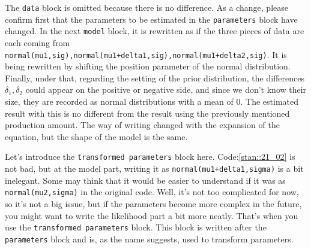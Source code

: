 \documentclass{ltjsbook}
\begin{document}
The \verb|data| block is omitted because there is no difference. As a change, please confirm first that the parameters to be estimated in the \verb|parameters| block have changed.
In the next \verb|model| block, it is rewritten as if the three pieces of data are each coming from \verb|normal(mu1,sig),normal(mu1+delta1,sig),normal(mu1+delta2,sig)|. It is being rewritten by shifting the position parameter of the normal distribution.
Finally, under that, regarding the setting of the prior distribution, the differences $\delta_1, \delta_2$ could appear on the positive or negative side, and since we don't know their size, they are recorded as normal distributions with a mean of 0.
The estimated result with this is no different from the result using the previously mentioned production amount. The way of writing changed with the expansion of the equation, but the shape of the model is the same.

Let's introduce the \verb|transformed parameters| block here. Code:\ref{stan::21_02} is not bad, but at the model part, writing it as \verb|normal(mu1+delta1,sigma)| is a bit inelegant. Some may think that it would be easier to understand if it was as \verb|normal(mu2,sigma)| in the original code. Well, it's not too complicated for now, so it's not a big issue, but if the parameters become more complex in the future, you might want to write the likelihood part a bit more neatly. That's when you use the \verb|transformed parameters| block. This block is written after the \verb|parameters| block and is, as the name suggests, used to transform parameters.
\end{document}
